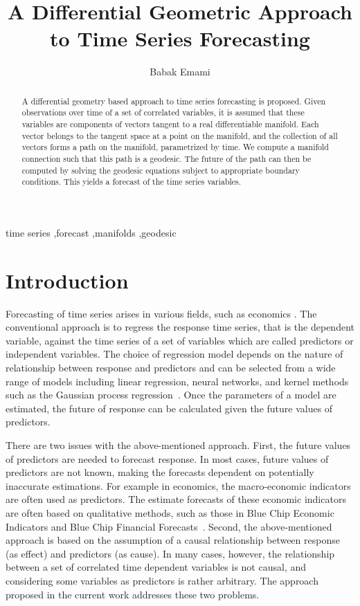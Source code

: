 \documentclass[a4paper,11pt]{elsarticle}
\title{A Differential Geometric Approach to Time Series Forecasting}
\author[1]{Babak Emami\corref{cor1}%
\fnref{fn1}}
\begin{document}
\begin{abstract}
  
A differential geometry based approach to time series forecasting is
proposed. Given observations over time of a set of correlated
variables, it is assumed that these variables are components of
vectors tangent to a real differentiable manifold. Each vector belongs
to the tangent space at a point on the manifold, and the collection of
all vectors forms a path on the manifold, parametrized by time. We
compute a manifold connection such that this path is a geodesic. The
future of the path can then be computed by solving the geodesic
equations subject to appropriate boundary conditions. This yields a
forecast of the time series variables.

\end{abstract}

\begin{keyword}
time series \sep forecast \sep manifolds \sep geodesic
\end{keyword}

\maketitle

\section{Introduction}\label{section:introduction}

Forecasting of time series arises in various fields, such as economics
\cite{kennedy-1998, fabozzi-etal-2014}. The conventional approach is
to regress the response time series, that is the dependent variable,
against the time series of a set of variables which are called
predictors or independent variables. The choice of regression model
depends on the nature of relationship between response and predictors
and can be selected from a wide range of models including linear
regression, neural networks, and kernel methods such as the Gaussian
process
regression~\cite{hastie-etal-2009,rasmussen-williams-2005}. Once the
parameters of a model are estimated, the future of response can be
calculated given the future values of predictors.

There are two issues with the above-mentioned approach. First, the
future values of predictors are needed to forecast response. In most
cases, future values of predictors are not known, making the forecasts
dependent on potentially inaccurate estimations. For example in
economics, the macro-economic indicators are often used as
predictors. The estimate forecasts of these economic indicators are
often based on qualitative methods, such as those in Blue Chip
Economic Indicators and Blue Chip Financial
Forecasts~\cite{ref:blue-chip}. Second, the above-mentioned approach
is based on the assumption of a causal relationship between response
(as effect) and predictors (as cause). In many cases, however, the
relationship between a set of correlated time dependent variables is
not causal, and considering some variables as predictors is rather
arbitrary. The approach proposed in the current work addresses these
two problems.
\end{document}
